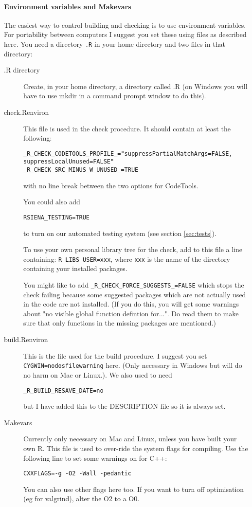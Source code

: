 \documentclass[12pt, a4paper]{article}
\renewcommand{\=}{\,=\,}
\newcommand{\+}{\,+\,}
\begin{document}
\paragraph{Environment variables and Makevars}
 \label{below}
 The easiest way to control building and checking is to use environment
 variables. For portability between computers I suggest you set these using
 files as described here. You need a directory \verb|.R| in your home directory
 and two files in that directory:
\begin{description}
\item[.R directory] Create, in your home directory, a directory called .R (on
  Windows you will have to use mkdir in a command prompt window to do this).
\item[check.Renviron] This file is used in the check procedure. It should
 contain at least the following:
{\small
\begin{verbatim}
_R_CHECK_CODETOOLS_PROFILE_="suppressPartialMatchArgs=FALSE,
suppressLocalUnused=FALSE"
_R_CHECK_SRC_MINUS_W_UNUSED_=TRUE
\end{verbatim}
}
with no line break between the two options for CodeTools.

You could also add
\begin{verbatim}
RSIENA_TESTING=TRUE
\end{verbatim}
to turn on our automated testing system (see section \ref{sec:tests}).

To use your own personal library tree for the check, add to this file a line
containing: \verb|R_LIBS_USER=xxx|, where \verb|xxx| is the name of the directory
containing your installed packages.

You might like to add \verb|_R_CHECK_FORCE_SUGGESTS_=FALSE| which stops the
check failing because some suggested packages which are not actually used in the
code are not installed. (If you do this, you will get some warnings about "no
visible global function defintion for...". Do read them to make sure that only
functions in the missing packages are mentioned.)

\item[build.Renviron] This is the file used for the build procedure.  I suggest
  you set \verb|CYGWIN=nodosfilewarning| here. (Only necessary in Windows but
  will do no harm on Mac or Linux.). We also used to need
\begin{verbatim}
_R_BUILD_RESAVE_DATE=no
\end{verbatim}
but I have added this to the DESCRIPTION file so it is always set.
\item[Makevars] Currently only necessary on Mac and Linux, unless you have built
  your own R. This file is used to over-ride the system flags for compiling. Use
  the following line to set some warnings on for C++:
 \begin{verbatim}
CXXFLAGS=-g -O2 -Wall -pedantic
\end{verbatim}
You can also use other flags here too.
If you want to turn off optimisation (eg for valgrind), alter the O2 to a O0.
\end{description}
\end{document}
